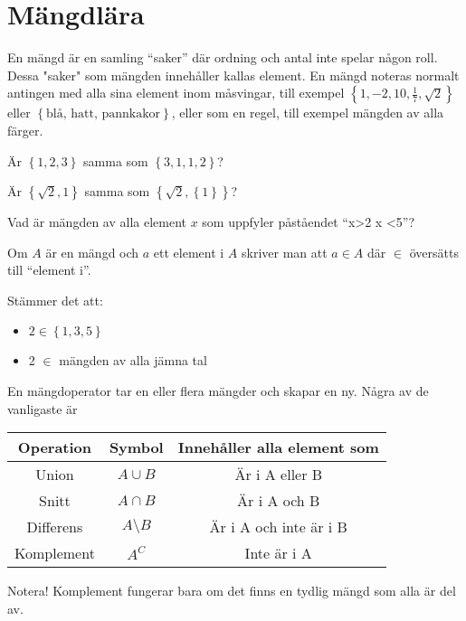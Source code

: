 \section{Mängdlära}

\begin{definition}[Mängd]
En mängd är en samling ``saker'' där ordning och antal inte spelar någon roll. Dessa "saker" som mängden innehåller kallas element. En mängd noteras normalt antingen med alla sina element inom måsvingar, till exempel \(\left\{1, -2, 10, \frac{1}{7}, \sqrt{2}  \right\}\) eller \(\left\{\text{blå, hatt, pannkakor} \right\}\), eller som en regel, till exempel mängden av alla färger.
\end{definition}

\begin{problem}
	Är \(\left\{1, 2, 3\right\}\) samma som \(\left\{3, 1, 1, 2\right\}\)?
\end{problem}

\begin{problem}
	Är \(\left\{\sqrt{2}, 1 \right\}\) samma som \(\left\{\sqrt{2} , \left\{1\right\}\right\}\)?
\end{problem}

\begin{problem}
	Vad är mängden av alla element \(x\) som uppfyler påståendet ``x>2 \land x <5''?
\end{problem}

\begin{definition}[Element]
	Om \(A\) är en mängd och \(a\) ett element i \(A\) skriver man att \(a \in A\) där \(\in\) översätts till ``element i''.
\end{definition}

\begin{problem}
	Stämmer det att:
	\begin{itemize}
		\item \(2 \in \left\{1, 3, 5\right\}\)
		\item 2 \(\in\) mängden av alla jämna tal 
	\end{itemize}
\end{problem}

\begin{definition}[Mängdoperationer]
	En mängdoperator tar en eller flera mängder och skapar en ny. Några av de vanligaste är
	\begin{center}
		\begin{tabular}{|ccc|}
			\hline
			Operation & Symbol & Innehåller alla element som\\ \hline
			Union & \(A\cup B\) & Är i A eller B \\ \hline
			Snitt & \(A \cap  B\) & Är i A och B \\ \hline
			Differens & \(A \setminus  B\) & Är i A och inte är i B \\ \hline
			Komplement & \(A^C\) & Inte är i A \\ \hline
		\end{tabular}
	\end{center}
	Notera! Komplement fungerar bara om det finns en tydlig mängd som alla är del av.
\end{definition}

